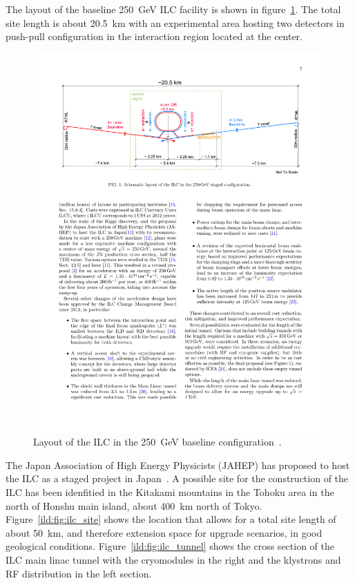 The layout of the baseline 250~GeV ILC facility is shown in figure~\ref{ild:fig:ilc_footprint}. The total site length is about 20.5~km with an experimental area hosting two detectors in push-pull configuration in the interaction region located at the center.
\begin{figure}[h!]
\centering
\includegraphics[width=0.9\hsize]{ILC/figs/ILC_Footprint.pdf}

\caption{\label{ild:fig:ilc_footprint}Layout of the ILC in the 250~GeV baseline configuration~\cite{Bambade:2019fyw}.}
\end{figure}
The Japan Association of High Energy Physicists (JAHEP) has proposed to host the ILC as a staged project in Japan~\cite{ild:bib:JAHEP}. A possible site for the construction of the ILC has been idenfitied in the Kitakami mountains in the Tohoku area in the north of Honshu main island, about 400~km north of Tokyo. Figure~\ref{ild:fig:ilc_site} shows the location that allows for a total site length of about 50~km, and therefore extension space for upgrade scenarios, in good geological conditions. Figure~\ref{ild:fig:ilc_tunnel} shows the cross section of the ILC main linac tunnel with the cryomodules in the right and the klystrons and RF distribution in the left section.
